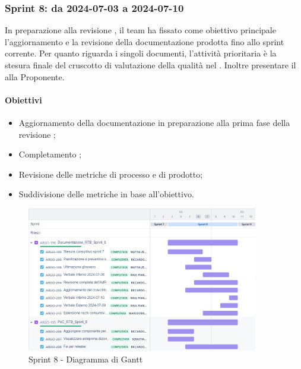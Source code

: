 \subsubsection{Sprint 8: da 2024-07-03 a 2024-07-10}
\par In preparazione alla revisione , il team ha fissato come obiettivo principale l’aggiornamento e la revisione della documentazione prodotta fino allo sprint corrente. Per quanto riguarda i singoli documenti, l’attività prioritaria è la stesura finale del cruscotto di valutazione della qualità nel \PdQ. Inoltre presentare il  alla Proponente.

\paragraph{Obiettivi}
\begin{itemize}
  \item Aggiornamento della documentazione in preparazione alla prima fase della revisione ;
  \item Completamento ;
  \item Revisione delle metriche di processo e di prodotto;
  \item Suddivisione delle metriche in base all'obiettivo.
\end{itemize}

\begin{figure}[H]
  \centering
  \includegraphics[width=0.90\textwidth]{assets/Pianificazione/Sprint-8/gantt.png}
  \caption{Sprint 8 - Diagramma di Gantt}\label{fig:sprint-8-gantt}
\end{figure}
